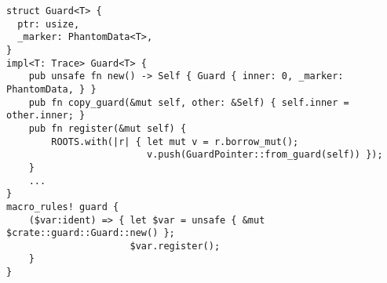 \begin{lstlisting}[caption=Excerpt of \mc{Guard}s definitions,label=lst:guard-impl]
struct Guard<T> {
  ptr: usize,
  _marker: PhantomData<T>,
}
impl<T: Trace> Guard<T> {
    pub unsafe fn new() -> Self { Guard { inner: 0, _marker: PhantomData, } }
    pub fn copy_guard(&mut self, other: &Self) { self.inner = other.inner; }
    pub fn register(&mut self) {
        ROOTS.with(|r| { let mut v = r.borrow_mut();
                         v.push(GuardPointer::from_guard(self)) });
    }
    ...
}
macro_rules! guard {
    ($var:ident) => { let $var = unsafe { &mut $crate::guard::Guard::new() };
                      $var.register();
    }
}\end{lstlisting}
